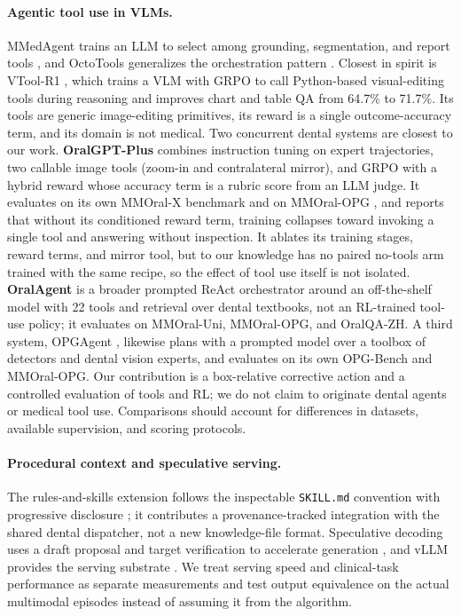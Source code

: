 \paragraph{Agentic tool use in VLMs.}
MMedAgent trains an LLM to select among grounding, segmentation, and report tools
\citep{li2024mmedagent}, and OctoTools generalizes the orchestration pattern
\citep{zhang2025octotools}. Closest in spirit is VTool-R1 \citep{wu2026vtool}, which trains a
VLM with GRPO to call Python-based visual-editing tools during reasoning and improves chart and
table QA from 64.7\% to 71.7\%. Its tools are generic image-editing primitives, its reward is a
single outcome-accuracy term, and its domain is not medical. Two concurrent dental systems are
closest to our work. \textbf{OralGPT-Plus} \citep{oralgptplus2026} combines instruction tuning on expert
trajectories, two callable image tools (zoom-in and contralateral mirror), and GRPO with a hybrid reward
whose accuracy term is a rubric score from an LLM judge. It evaluates on its own MMOral-X benchmark and on
MMOral-OPG \citep{hao2025mmoral}, and reports that without its conditioned reward term, training collapses toward
invoking a single tool and answering without inspection. It ablates its training stages, reward terms, and
mirror tool, but to our knowledge has no paired no-tools arm trained with the same recipe, so the effect of tool
use itself is not isolated. \textbf{OralAgent} \citep{oralagent2026} is a broader prompted ReAct orchestrator
around an off-the-shelf model with 22 tools and retrieval over dental textbooks, not an RL-trained tool-use
policy; it evaluates on MMOral-Uni, MMOral-OPG, and OralQA-ZH. A third system, OPGAgent
\citep{yu2026opgagent}, likewise plans with a prompted model over a toolbox of detectors and dental vision experts,
and evaluates on its own OPG-Bench and MMOral-OPG. Our contribution is a box-relative corrective action and a
controlled evaluation of tools and RL; we do not claim to originate dental agents or medical tool use.
Comparisons should account for differences in datasets, available supervision, and scoring protocols.

\paragraph{Procedural context and speculative serving.}
The rules-and-skills extension follows the inspectable \texttt{SKILL.md} convention with
progressive disclosure \citep{agentskills2026}; it contributes a provenance-tracked integration
with the shared dental dispatcher, not a new knowledge-file format. Speculative decoding uses a
draft proposal and target verification to accelerate generation
\citep{leviathan2023fast,chen2023accelerating}, and vLLM provides the serving substrate
\citep{kwon2023efficient}. We treat serving speed and clinical-task performance as separate
measurements and test output equivalence on the actual multimodal episodes instead of assuming
it from the algorithm.

